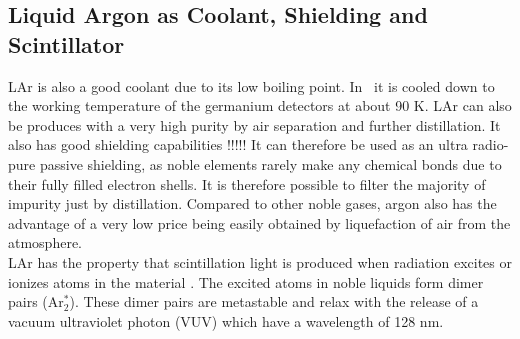\documentclass[encoding=utf8,british]{tumphthesis}
\begin{document}
\subsection{Liquid Argon as Coolant, Shielding and Scintillator} 
\label{sec:LArcoolant}


LAr is also a good coolant due to its low boiling point.
In \gerda\, it is cooled down to the working temperature of the germanium detectors at about 90 K.
LAr can also be produces with a very high purity by air separation and further distillation.
It also has good shielding capabilities !!!!!
It can therefore be used as an ultra radio-pure passive shielding, as noble elements rarely make any chemical bonds due to their fully filled electron shells.
It is therefore possible to filter the majority of impurity just by distillation.
Compared to other noble gases, argon also has the advantage of a very low price being easily obtained by liquefaction of air from the atmosphere.
\\

LAr has the property that scintillation light is produced when radiation excites or ionizes atoms in the material \cite{olsen_improvements_nodate}.
The excited atoms in noble liquids form dimer pairs (Ar$^*_2$).
These dimer pairs are metastable and relax with the release of a vacuum ultraviolet photon (VUV)  which have a wavelength of 128 nm.
\\
\end{document}
